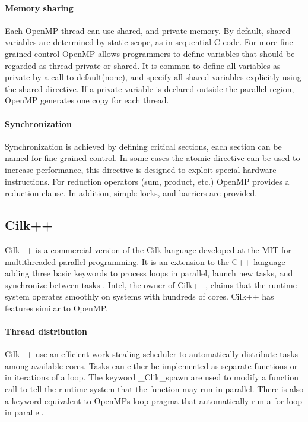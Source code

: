 \paragraph{Memory sharing} Each OpenMP thread can use shared, and
private memory. By default, shared variables are determined by static
scope, as in sequential C code. For more fine-grained control OpenMP
allows programmers to define variables that should be regarded as
thread private or shared. It is common to define all variables as
private by a call to default(none), and specify all shared variables
explicitly using the shared directive. If a private variable is
declared outside the parallel region, OpenMP generates one copy for
each thread.

\paragraph{Synchronization} Synchronization is achieved by defining
critical sections, each section can be named for fine-grained control.
In some cases the atomic directive can be used to increase
performance, this directive is designed to exploit special hardware
instructions. For reduction operators (sum, product, etc.) OpenMP
provides a reduction clause. In addition, simple locks, and barriers
are provided. \cite{pacheco}

\subsection{Cilk++}

Cilk++ is a commercial version of the Cilk language developed at the
MIT for multithreaded parallel programming. It is an extension to the
C++ language adding three basic keywords to process loops in parallel,
launch new tasks, and synchronize between tasks
\cite{multicorecomparison}. Intel, the owner of Cilk++, claims that
the runtime system operates smoothly on systems with hundreds of
cores. Cilk++ has features similar to OpenMP.

\paragraph{Thread distribution} Cilk++ use an efficient work-stealing
scheduler to automatically distribute tasks among available cores.
Tasks can either be implemented as separate functions or in iterations
of a loop. The keyword \_Clik\_spawn are used to modify a function
call to tell the runtime system that the function may run in parallel.
There is also a keyword equivalent to OpenMPs loop pragma that
automatically run a for-loop in parallel.

